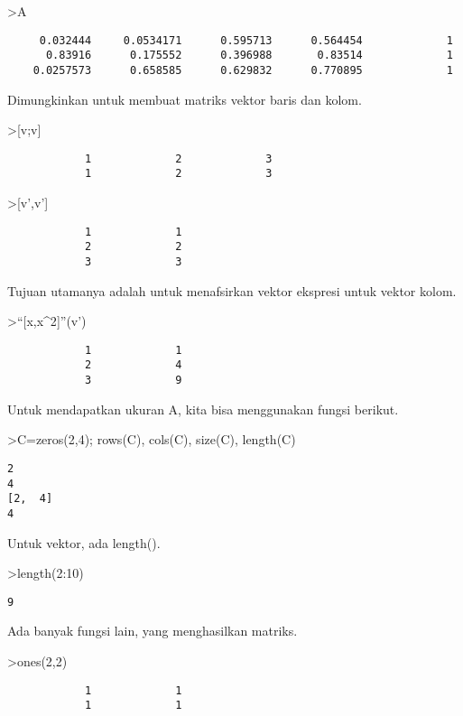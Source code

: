 \documentclass[
]{book}
\begin{document}
\textgreater A

\begin{verbatim}
     0.032444     0.0534171      0.595713      0.564454             1 
      0.83916      0.175552      0.396988       0.83514             1 
    0.0257573      0.658585      0.629832      0.770895             1 
\end{verbatim}

Dimungkinkan untuk membuat matriks vektor baris dan kolom.

\textgreater{[}v;v{]}

\begin{verbatim}
            1             2             3 
            1             2             3 
\end{verbatim}

\textgreater{[}v',v'{]}

\begin{verbatim}
            1             1 
            2             2 
            3             3 
\end{verbatim}

Tujuan utamanya adalah untuk menafsirkan vektor ekspresi untuk vektor kolom.

\textgreater{}``{[}x,x\^{}2{]}''(v')

\begin{verbatim}
            1             1 
            2             4 
            3             9 
\end{verbatim}

Untuk mendapatkan ukuran A, kita bisa menggunakan fungsi berikut.

\textgreater C=zeros(2,4); rows(C), cols(C), size(C), length(C)

\begin{verbatim}
2
4
[2,  4]
4
\end{verbatim}

Untuk vektor, ada length().

\textgreater length(2:10)

\begin{verbatim}
9
\end{verbatim}

Ada banyak fungsi lain, yang menghasilkan matriks.

\textgreater ones(2,2)

\begin{verbatim}
            1             1 
            1             1 
\end{verbatim}
\end{document}
